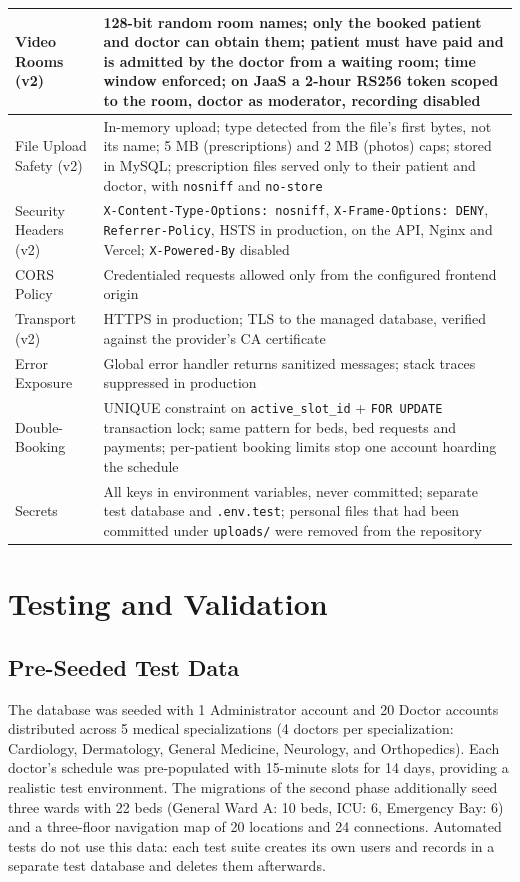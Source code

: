 \begin{longtable}{|L{3.3cm}|L{10.2cm}|}
\hline
Video Rooms (v2) & 128-bit random room names; only the booked patient and doctor can obtain them; patient must have paid and is admitted by the doctor from a waiting room; time window enforced; on JaaS a 2-hour RS256 token scoped to the room, doctor as moderator, recording disabled \\
\hline
File Upload Safety (v2) & In-memory upload; type detected from the file's first bytes, not its name; 5 MB (prescriptions) and 2 MB (photos) caps; stored in MySQL; prescription files served only to their patient and doctor, with \texttt{nosniff} and \texttt{no-store} \\
\hline
Security Headers (v2) & \texttt{X-Content-Type-Options: nosniff}, \texttt{X-Frame-Options: DENY}, \texttt{Referrer-Policy}, HSTS in production, on the API, Nginx and Vercel; \texttt{X-Powered-By} disabled \\
\hline
CORS Policy & Credentialed requests allowed only from the configured frontend origin \\
\hline
Transport (v2) & HTTPS in production; TLS to the managed database, verified against the provider's CA certificate \\
\hline
Error Exposure & Global error handler returns sanitized messages; stack traces suppressed in production \\
\hline
Double-Booking & UNIQUE constraint on \texttt{active\_slot\_id} + \texttt{FOR UPDATE} transaction lock; same pattern for beds, bed requests and payments; per-patient booking limits stop one account hoarding the schedule \\
\hline
Secrets & All keys in environment variables, never committed; separate test database and \texttt{.env.test}; personal files that had been committed under \texttt{uploads/} were removed from the repository \\
\hline
\end{longtable}

\FloatBarrier
\section{Testing and Validation}

\FloatBarrier
\subsection{Pre-Seeded Test Data}

The database was seeded with 1 Administrator account and 20 Doctor accounts distributed across 5 medical specializations (4 doctors per specialization: Cardiology, Dermatology, General Medicine, Neurology, and Orthopedics). Each doctor's schedule was pre-populated with 15-minute slots for 14 days, providing a realistic test environment. The migrations of the second phase additionally seed three wards with 22 beds (General Ward A: 10 beds, ICU: 6, Emergency Bay: 6) and a three-floor navigation map of 20 locations and 24 connections. Automated tests do not use this data: each test suite creates its own users and records in a separate test database and deletes them afterwards.

